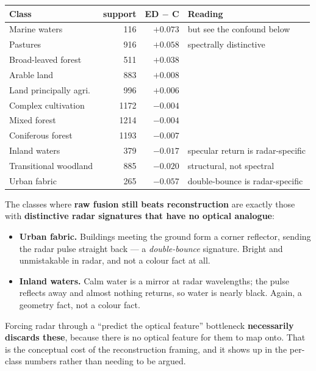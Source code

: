 \documentclass[11pt,a4paper]{report}
\begin{document}
\begin{center}
\small
\begin{tabular}{@{}lrrp{6.6cm}@{}}
\toprule
\textbf{Class} & \textbf{support} & \textbf{ED $-$ C} & \textbf{Reading} \\
\midrule
Marine waters        & 116  & $+0.073$ & but see the confound below \\
Pastures             & 916  & $+0.058$ & spectrally distinctive \\
Broad-leaved forest  & 511  & $+0.038$ & \\
Arable land          & 883  & $+0.008$ & \\
Land principally agri.\ & 996 & $+0.006$ & \\
Complex cultivation  & 1172 & $-0.004$ & \\
Mixed forest         & 1214 & $-0.004$ & \\
Coniferous forest    & 1193 & $-0.007$ & \\
Inland waters        & 379  & $-0.017$ & specular return is radar-specific \\
Transitional woodland & 885 & $-0.020$ & structural, not spectral \\
Urban fabric         & 265  & $-0.057$ & double-bounce is radar-specific \\
\bottomrule
\end{tabular}
\end{center}

\begin{keyfinding}
The classes where \textbf{raw fusion still beats reconstruction} are exactly
those with \textbf{distinctive radar signatures that have no optical
analogue}:

\begin{itemize}
\item \textbf{Urban fabric.} Buildings meeting the ground form a corner
      reflector, sending the radar pulse straight back --- a
      \emph{double-bounce} signature. Bright and unmistakable in radar, and not
      a colour fact at all.
\item \textbf{Inland waters.} Calm water is a mirror at radar wavelengths;
      the pulse reflects away and almost nothing returns, so water is nearly
      black. Again, a geometry fact, not a colour fact.
\end{itemize}

Forcing radar through a ``predict the optical feature'' bottleneck
\textbf{necessarily discards these}, because there is no optical feature for
them to map onto. That is the conceptual cost of the reconstruction framing, and
it shows up in the per-class numbers rather than needing to be argued.
\end{keyfinding}
\end{document}
